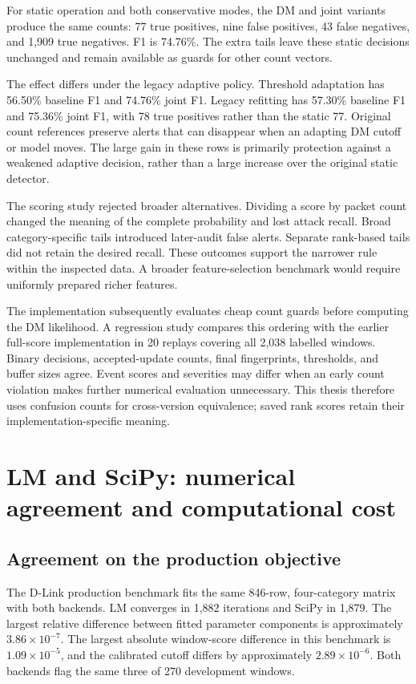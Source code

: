 For static operation and both conservative modes, the DM and joint
variants produce the same counts: 77 true positives, nine false
positives, 43 false negatives, and 1,909 true negatives. F1 is
74.76\%. The extra tails leave these static decisions unchanged and remain
available as guards for other count vectors.

The effect differs under the legacy adaptive policy. Threshold
adaptation has 56.50\% baseline F1 and 74.76\% joint F1. Legacy
refitting has 57.30\% baseline F1 and 75.36\% joint F1, with 78 true
positives rather than the static 77. Original count references
preserve alerts that can disappear when an adapting DM cutoff or model
moves. The large gain in these rows is primarily protection against
a weakened adaptive decision, rather than a large increase over the
original static detector.

The scoring study rejected broader alternatives. Dividing a score
by packet count changed the meaning of the complete probability and
lost attack recall. Broad category-specific tails introduced later-audit
false alerts. Separate rank-based tails did not retain the desired
recall. These outcomes support the narrower rule within the inspected
data. A broader feature-selection benchmark would require uniformly
prepared richer features.

The implementation subsequently evaluates cheap count guards before
computing the DM likelihood. A regression study compares this ordering
with the earlier full-score implementation in 20 replays covering
all 2,038 labelled windows. Binary decisions, accepted-update counts,
final fingerprints, thresholds, and buffer sizes agree. Event scores
and severities may differ when an early count violation makes further
numerical evaluation unnecessary. This thesis therefore uses confusion
counts for cross-version equivalence; saved rank scores retain their
implementation-specific meaning.

\section{LM and SciPy: numerical agreement and computational cost}
\label{sec:numerical-results}

\subsection{Agreement on the production objective}

The D-Link production benchmark fits the same 846-row, four-category
matrix with both backends. LM converges in 1,882 iterations and SciPy
in 1,879. The largest relative difference between fitted parameter
components is approximately $3.86\times10^{-7}$. The largest absolute
window-score difference in this benchmark is $1.09\times10^{-5}$,
and the calibrated cutoff differs by approximately
$2.89\times10^{-6}$. Both backends flag the same three of 270
development windows.

